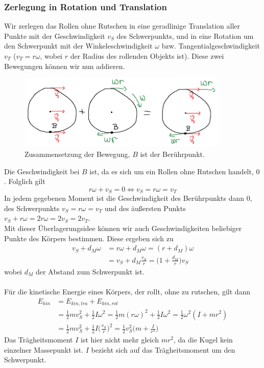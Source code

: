 \documentclass[11pt]{article}
\begin{document}
\subsubsection{Zerlegung in Rotation und Translation}
Wir zerlegen das Rollen ohne Rutschen in eine geradlinige Translation aller Punkte mit der Geschwindigkeit $v_S$ des Schwerpunkts, und in eine Rotation um den Schwerpunkt mit der Winkeleschwindigkeit $\omega$ bzw. Tangentialgeschwindigkeit $v_T$ ($v_T = r\omega$, wobei $r$ der Radius des rollenden Objekts ist). Diese zwei Bewegungen können wir nun addieren. 
\begin{figure}[H]
        \centering
        \includegraphics[width = 0.9\textwidth]{abb/5-komb-rot-tra-rollen-ohne-rutschen/kinematik-kombiniert.png}
        \caption{Zusammensetzung der Bewegung, $B$ ist der Berührpunkt.}
\end{figure}
Die Geschwindigkeit bei $B$ ist, da es sich um ein Rollen ohne Rutschen handelt, $0$. Folglich gilt 
\begin{equation*}
        r\omega + v_S = 0 \iff v_S = r\omega = v_T
\end{equation*}
In jedem gegebenen Moment ist die Geschwindigkeit des Berührpunkts dann $0$, des Schwerpunkts $v_S = r\omega = v_T$ und des äußersten Punkts $v_S + r\omega = 2r\omega = 2v_S = 2v_T$. \\
Mit dieser Überlagerungsidee können wir auch Geschwindigkeiten beliebiger Punkte des Körpers bestimmen. Diese ergeben sich zu 
\begin{align*}
        v_S + d_M\omega &= r\omega + d_M\omega = (r+d_M)\omega \\
        &= v_S + d_M\frac{v_S}{r} = \bigg(1 + \frac{d_M}{r}\bigg)v_S
\end{align*}
wobei $d_M$ der Abstand zum Schwerpunkt ist.  \\\\
Für die kinetische Energie eines Körpers, der rollt, ohne zu rutschen, gilt dann 
\begin{align*}
        E_{kin} &= E_{kin, tra} + E_{kin, rot} \\
        &= \frac{1}{2}mv_S^2 + \frac{1}{2}I\omega^2 = \frac{1}{2}m(r\omega)^2 + \frac{1}{2}I\omega^2 = \frac{1}{2}\omega^2 (I + mr^2)\\  
        &= \frac{1}{2}mv_S^2 + \frac{1}{2}I\bigg(\frac{v_S}{r}\bigg)^2 = \frac{1}{2}v_S^2\bigg(m + \frac{I}{r^2}\bigg)
\end{align*}
Das Trägheitsmoment $I$ ist hier nicht mehr gleich $mr^2$, da die Kugel kein einzelner Massepunkt ist. $I$ bezieht sich auf das Trägheitsmoment um den Schwerpunkt. 
\end{document}

